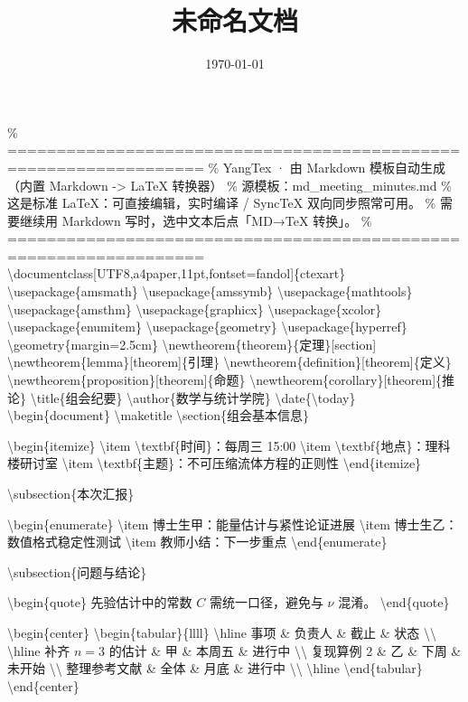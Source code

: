 \documentclass[UTF8,a4paper,11pt,fontset=fandol]{ctexart}
\title{未命名文档}
\author{}
\date{\today}
\begin{document}
\maketitle

\% ================================================================== \% YangTex · 由 Markdown 模板自动生成（内置 Markdown -\textgreater{} LaTeX 转换器） \% 源模板：md\_meeting\_minutes.md \% 这是标准 LaTeX：可直接编辑，实时编译 / SyncTeX 双向同步照常可用。 \% 需要继续用 Markdown 写时，选中文本后点「MD→TeX 转换」。 \% ================================================================== \textbackslash{}documentclass[UTF8,a4paper,11pt,fontset=fandol]\{ctexart\} \textbackslash{}usepackage\{amsmath\} \textbackslash{}usepackage\{amssymb\} \textbackslash{}usepackage\{mathtools\} \textbackslash{}usepackage\{amsthm\} \textbackslash{}usepackage\{graphicx\} \textbackslash{}usepackage\{xcolor\} \textbackslash{}usepackage\{enumitem\} \textbackslash{}usepackage\{geometry\} \textbackslash{}usepackage\{hyperref\} \textbackslash{}geometry\{margin=2.5cm\} \textbackslash{}newtheorem\{theorem\}\{定理\}[section] \textbackslash{}newtheorem\{lemma\}[theorem]\{引理\} \textbackslash{}newtheorem\{definition\}[theorem]\{定义\} \textbackslash{}newtheorem\{proposition\}[theorem]\{命题\} \textbackslash{}newtheorem\{corollary\}[theorem]\{推论\} \textbackslash{}title\{组会纪要\} \textbackslash{}author\{数学与统计学院\} \textbackslash{}date\{\textbackslash{}today\} \textbackslash{}begin\{document\} \textbackslash{}maketitle \textbackslash{}section\{组会基本信息\}

\textbackslash{}begin\{itemize\} \textbackslash{}item \textbackslash{}textbf\{时间\}：每周三 15:00 \textbackslash{}item \textbackslash{}textbf\{地点\}：理科楼研讨室 \textbackslash{}item \textbackslash{}textbf\{主题\}：不可压缩流体方程的正则性 \textbackslash{}end\{itemize\}

\textbackslash{}subsection\{本次汇报\}

\textbackslash{}begin\{enumerate\} \textbackslash{}item 博士生甲：能量估计与紧性论证进展 \textbackslash{}item 博士生乙：数值格式稳定性测试 \textbackslash{}item 教师小结：下一步重点 \textbackslash{}end\{enumerate\}

\textbackslash{}subsection\{问题与结论\}

\textbackslash{}begin\{quote\} 先验估计中的常数 $C$ 需统一口径，避免与 $\nu$ 混淆。 \textbackslash{}end\{quote\}

\textbackslash{}begin\{center\} \textbackslash{}begin\{tabular\}\{l\textbar{}l\textbar{}l\textbar{}l\} \textbackslash{}hline 事项 \& 负责人 \& 截止 \& 状态 \textbackslash{}\textbackslash{} \textbackslash{}hline 补齐 $n=3$ 的估计 \& 甲 \& 本周五 \& 进行中 \textbackslash{}\textbackslash{} 复现算例 2 \& 乙 \& 下周 \& 未开始 \textbackslash{}\textbackslash{} 整理参考文献 \& 全体 \& 月底 \& 进行中 \textbackslash{}\textbackslash{} \textbackslash{}hline \textbackslash{}end\{tabular\} \textbackslash{}end\{center\}
\end{document}
